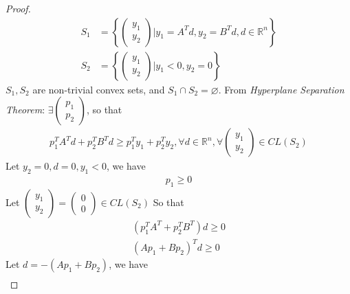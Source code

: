\documentclass[runningheads]{llncs}
\begin{document}
\begin{proof}
\begin{align}
        S_1 &= 
        \left\{
            \left(
            \begin{array}{ll}
                y_1 \\
                y_2
            \end{array}
            \right)
            | y_1 = A^Td, y_2 = B^Td, d \in \mathbb{R}^n
        \right\} \\
        S_2 &= 
        \left\{
            \left(
            \begin{array}{ll}
                y_1 \\
                y_2
            \end{array}
            \right)
            | y_1 < 0, y_2 = 0
        \right\} 
    \end{align}
    $S_1, S_2$ are non-trivial convex sets,
    and $S_1 \cap S_2 = \varnothing$.
    From \textit{Hyperplane Separation Theorem}:
    $\exists 
    \left(
    \begin{array}{ll}
        p_1 \\
        p_2
    \end{array}
    \right)$, so that
    \begin{align}
        p_1^TA^Td + p_2^TB^Td \geq p_1^Ty_1 + p_2^Ty_2,
        \forall d \in \mathbb{R}^n, 
        \forall\left(
        \begin{array}{ll}
            y_1 \\
            y_2
        \end{array}
        \right) \in CL(S_2)
    \end{align}
    Let $y_2 = 0, d = 0, y_1 < 0$, we have
    \begin{align}
        p_1 \geq 0
    \end{align}
    Let $\left(
        \begin{array}{ll}
            y_1 \\
            y_2
        \end{array}
        \right) = 
        \left(
        \begin{array}{ll}
            0 \\
            0
        \end{array}
        \right) 
         \in CL(S_2)$
    So that
    \begin{align}
        (p_1^TA^T + p_2^TB^T)d \geq 0 \\
        (Ap_1 + Bp_2)^Td \geq 0
    \end{align}
    Let $d = - (Ap_1 + Bp_2)$, we have
    \begin{align}

\end{align}
\end{proof}
\end{document}
